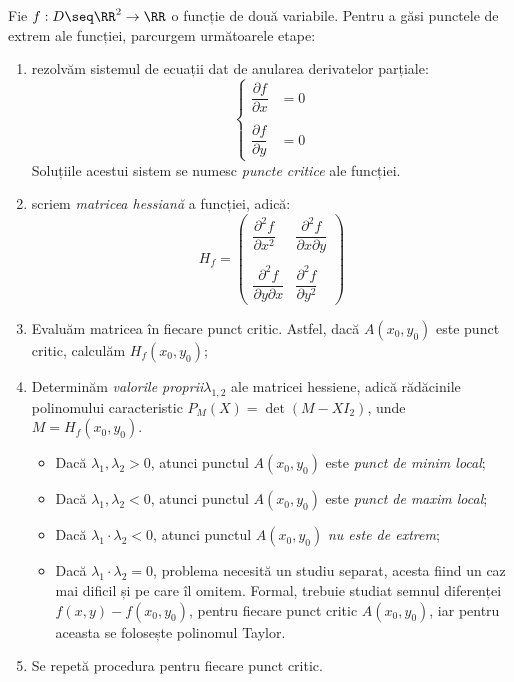 Fie $ f : D \seq \RR^2 \to \RR $ o funcție de două variabile. Pentru a
găsi punctele de extrem ale funcției, parcurgem următoarele etape:
\begin{enumerate}[(1)]
\item rezolvăm sistemul de ecuații dat de anularea derivatelor parțiale:
  \[
    \begin{cases}
      \dfrac{\partial f}{\partial x} &= 0 \\
      & \\
      \dfrac{\partial f}{\partial y} &= 0
    \end{cases}
  \]
  Soluțiile acestui sistem se numesc \emph{puncte critice} ale funcției.
\item scriem \emph{matricea hessiană} a funcției, adică:
  \[
    H_f =
    \begin{pmatrix}
      \dfrac{\partial^2 f}{\partial x^2} & \dfrac{\partial^2 f}{\partial x \partial y} \\
      & \\
      \dfrac{\partial^2 f}{\partial y \partial x} & \dfrac{\partial^2 f}{\partial y^2}
    \end{pmatrix}
  \]
\item Evaluăm matricea în fiecare punct critic. Astfel, dacă $ A(x_0, y_0) $ este
  punct critic, calculăm $ H_f(x_0, y_0) $;
\item Determinăm \emph{valorile proprii}\footnotemark $ \lambda_{1,2} $ ale matricei hessiene,
  adică rădăcinile polinomului caracteristic $ P_M(X) = \det (M - XI_2) $,
  unde $ M = H_f(x_0, y_0)$.
  \begin{itemize}
  \item Dacă $ \lambda_1, \lambda_2 > 0 $, atunci punctul $ A(x_0, y_0) $
    este \emph{punct de minim local};
  \item Dacă $ \lambda_1, \lambda_2 < 0 $, atunci punctul $ A(x_0, y_0) $
    este \emph{punct de maxim local};
  \item Dacă $ \lambda_1 \cdot \lambda_2 < 0 $, atunci punctul $ A(x_0, y_0) $
    \emph{nu este de extrem};
  \item Dacă $ \lambda_1 \cdot \lambda_2 = 0 $, problema necesită un studiu
    separat, acesta fiind un caz mai dificil și pe care îl omitem. Formal, trebuie
    studiat semnul diferenței $ f(x, y) - f(x_0, y_0) $, pentru fiecare punct
    critic $ A(x_0, y_0) $, iar pentru aceasta se folosește polinomul Taylor.
  \end{itemize}
\item Se repetă procedura pentru fiecare punct critic.
\end{enumerate}

